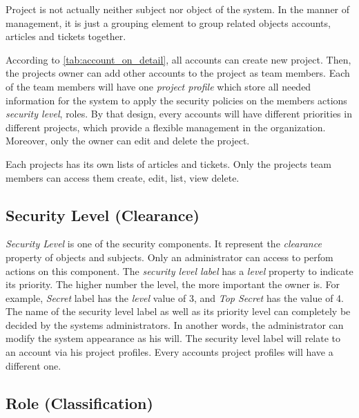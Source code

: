 Project is not actually neither subject nor object of the system.
In the manner of management, it is just a grouping element to group related objects \eg accounts, articles and tickets together.

According to \autoref{tab:account_on_detail}, all accounts can create new project.
Then, the projects owner can add other accounts to the project as team members.
Each of the team members will have one \emph{project profile} which store all needed information for the system to apply the security policies on the members actions \eg \emph{security level}, roles.
By that design, every accounts will have different priorities in different projects, which provide a flexible management in the organization.
Moreover, only the owner can edit and delete the project.

Each projects has its own lists of articles and tickets.
Only the projects team members can access them \eg create, edit, list, view delete.


\subsection{Security Level (Clearance)}
\label{ch:hopot_project:project_components:security_level}

\emph{Security Level} is one of the security components.
It represent the \emph{clearance} property of objects and subjects.
Only an administrator can access to perfom actions on this component.
The \emph{security level label} has a \emph{level} property to indicate its priority.
The higher number the level, the more important the owner is.
For example, \emph{Secret} label has the \emph{level} value of 3, and \emph{Top Secret} has the value of 4.
The name of the security level label as well as its priority level can completely be decided by the systems administrators.
In another words, the administrator can modify the system appearance as his will. 
The security level label will relate to an account via his project profiles. Every accounts project profiles will have a different one.


\subsection{Role (Classification)}
\label{ch:hopot_project:role}

